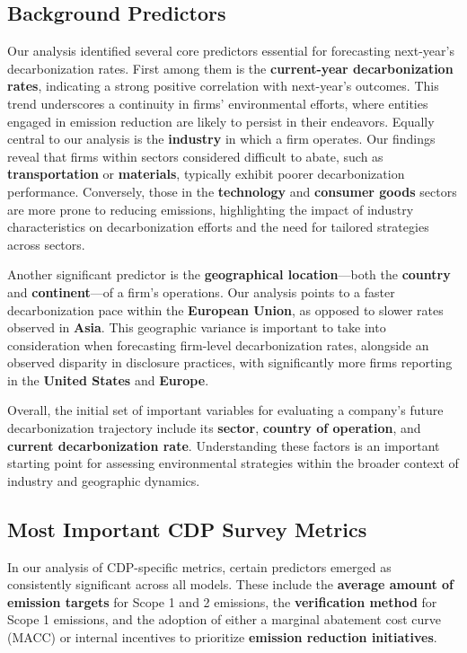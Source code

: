 \subsection{Background Predictors}
Our analysis identified several core predictors essential for forecasting next-year's decarbonization rates. First among them is the \textbf{current-year decarbonization rates}, indicating a strong positive correlation with next-year's outcomes. This trend underscores a continuity in firms' environmental efforts, where entities engaged in emission reduction are likely to persist in their endeavors. Equally central to our analysis is the \textbf{industry} in which a firm operates. Our findings reveal that firms within sectors considered difficult to abate, such as \textbf{transportation} or \textbf{materials}, typically exhibit poorer decarbonization performance. Conversely, those in the \textbf{technology} and \textbf{consumer goods} sectors are more prone to reducing emissions, highlighting the impact of industry characteristics on decarbonization efforts and the need for tailored strategies across sectors.

Another significant predictor is the \textbf{geographical location}—both the \textbf{country} and \textbf{continent}—of a firm's operations. Our analysis points to a faster decarbonization pace within the \textbf{European Union}, as opposed to slower rates observed in \textbf{Asia}. This geographic variance is important to take into consideration when forecasting firm-level decarbonization rates, alongside an observed disparity in disclosure practices, with significantly more firms reporting in the \textbf{United States} and \textbf{Europe}.

Overall, the initial set of important variables for evaluating a company's future decarbonization trajectory include its \textbf{sector}, \textbf{country of operation}, and \textbf{current decarbonization rate}. Understanding these factors is an important starting point for assessing environmental strategies within the broader context of industry and geographic dynamics.

\subsection{Most Important CDP Survey Metrics}

In our analysis of CDP-specific metrics, certain predictors emerged as consistently significant across all models. These include the \textbf{average amount of emission targets} for Scope 1 and 2 emissions, the \textbf{verification method} for Scope 1 emissions, and the adoption of either a marginal abatement cost curve (MACC) or internal incentives to prioritize \textbf{emission reduction initiatives}.

